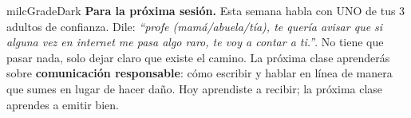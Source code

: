 \documentclass[11pt,letterpaper]{article}
\begin{document}
\begin{infoband}{milcGradeDark}
\textbf{Para la próxima sesión.} Esta semana habla con UNO de tus 3 adultos de confianza. Dile: \emph{``profe (mamá/abuela/tía), te quería avisar que si alguna vez en internet me pasa algo raro, te voy a contar a ti.''}. No tiene que pasar nada, solo dejar claro que existe el camino. La próxima clase aprenderás sobre \textbf{comunicación responsable}: cómo escribir y hablar en línea de manera que sumes en lugar de hacer daño. Hoy aprendiste a recibir; la próxima clase aprendes a emitir bien.
\end{infoband}
\end{document}
